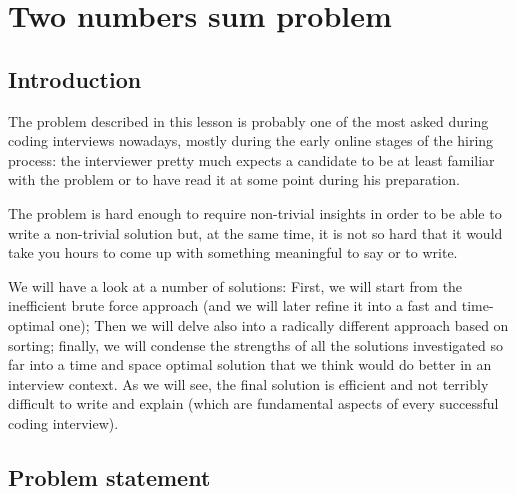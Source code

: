 %


\chapter{Two numbers sum problem}
\label{ch:two_numbers_sum}
\section*{Introduction}
The problem described in this lesson is probably one of the most asked during coding interviews nowadays, mostly 
during the early online stages of the hiring process: the interviewer pretty much expects a candidate to be at least familiar with the problem or to have read it at some point during his preparation.

The problem is hard enough to require non-trivial insights in order to be able to write a non-trivial solution but, at the same time, it is not so hard that it would take you hours to come up with something meaningful to say or to write.

We will have a look at a number of solutions: First, we will start from the inefficient brute force approach (and we will later refine it into a fast and time-optimal one);
Then we will delve also into a radically different approach based on sorting; finally, we will condense the strengths of all the solutions investigated so far into a time and space optimal solution that we think would do better in an interview context. As we will see, the final solution is efficient and not terribly difficult to write and explain (which are fundamental aspects of every successful coding interview).


\section{Problem statement}

